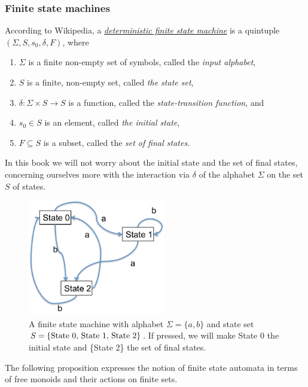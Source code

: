 \documentclass{book}
\def\tn{\textnormal}
\def\to{\rightarrow}
\def\taking{\colon}
\def\ss{\subseteq}
\theoremstyle{remark}
\theoremstyle{definition}
\begin{document}

\subsubsection{Finite state machines}\label{sec:FSMs}

According to Wikipedia, a \href{http://en.wikipedia.org/wiki/Finite_state_machine#Mathematical_model}{\em deterministic finite state machine} is a quintuple $(\Sigma,S,s_0,\delta,F)$, where
\begin{enumerate}
\item $\Sigma$ is a finite non-empty set of symbols, called the {\em input alphabet},
\item $S$ is a finite, non-empty set, called {\em the state set},
\item $\delta\taking \Sigma\times S\to S$ is a function, called the {\em state-transition function}, and
\item $s_0\in S$ is an element, called {\em the initial state},
\item $F\ss S$ is a subset, called the {\em set of final states}.
\end{enumerate}

In this book we will not worry about the initial state and the set of final states, concerning ourselves more with the interaction via $\delta$ of the alphabet $\Sigma$ on the set $S$ of states.

\begin{figure}[h]
\begin{center}
\includegraphics[height=2in]{FSM1}
\end{center}
\caption{A finite state machine with alphabet $\Sigma=\{a,b\}$ and state set $S=\{\tn{State 0, State 1, State 2}\}$. If pressed, we will make State 0 the initial state and \{State 2\} the set of final states.}\label{fig:fsa}
\end{figure}
The following proposition expresses the notion of finite state automata in terms of free monoids and their actions on finite sets.
\end{document}
